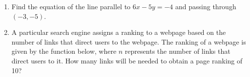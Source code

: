 \documentclass[11pt]{article}
\begin{document}
\begin{enumerate}
{{\begin{itemize}
\item
(b) \(-6\)

\item
(c) \(-3\)

\item
(d) \(x = 2\)

\end{itemize}
}
}

\newpage

% 

\item %
\providecommand{\stxKnowl}{}\renewcommand{\stxKnowl}[1]{#1}
\providecommand{\stxOuttro}{}\renewcommand{\stxOuttro}[1]{#1}
\providecommand{\stxTitle}{}\renewcommand{\stxTitle}[1]{#1}
\renewcommand{\stxOuttro}[1]{}
\stxKnowl{
 Find the equation of the line parallel to \(6x - 5y = -4\) and passing through \((-3, -5)\). 

\stxOuttro{
Solution

Slope:

 \(6x - 5y = -4\) 

 \(-5y = -6x + -4\) 

 \(y = \frac{6}{5}x + \frac{4}{5}\) 

 \(m = \frac{6}{5}\) 

Y-intercept:

 \(y = mx + b\) 

 \(-5 = \frac{6}{5}(-3) + b\) 

 \(-5 = -\frac{18}{5} + b\) 

 \(b = -\frac{7}{5}\) 

 \(\boxed{ y = \frac{6}{5}x - \frac{7}{5} }\) 

}
}

\newpage

% 

\item %
\providecommand{\stxKnowl}{}\renewcommand{\stxKnowl}[1]{#1}
\providecommand{\stxOuttro}{}\renewcommand{\stxOuttro}[1]{#1}
\providecommand{\stxTitle}{}\renewcommand{\stxTitle}[1]{#1}
\renewcommand{\stxOuttro}[1]{}
\stxKnowl{
 A particular search engine assigns a ranking to a webpage based on the number of links that direct users to the webpage. The ranking of a webpage is given by the function below, where \(n\) represents the number of links that direct users to it. How many links will be needed to obtain a page ranking of 10? 

}
\end{enumerate}
\end{document}
